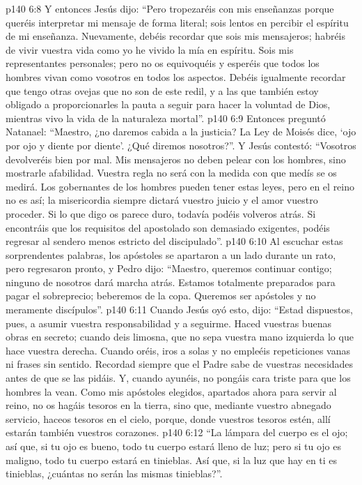 \vs p140 6:8 Y entonces Jesús dijo: “Pero tropezaréis con mis enseñanzas porque queréis interpretar mi mensaje de forma literal; sois lentos en percibir el espíritu de mi enseñanza. Nuevamente, debéis recordar que sois mis mensajeros; habréis de vivir vuestra vida como yo he vivido la mía en espíritu. Sois mis representantes personales; pero no os equivoquéis y esperéis que todos los hombres vivan como vosotros en todos los aspectos. Debéis igualmente recordar que tengo otras ovejas que no son de este redil, y a las que también estoy obligado a proporcionarles la pauta a seguir para hacer la voluntad de Dios, mientras vivo la vida de la naturaleza mortal”.
\vs p140 6:9 Entonces preguntó Natanael: “Maestro, ¿no daremos cabida a la justicia? La Ley de Moisés dice, ‘ojo por ojo y diente por diente’. ¿Qué diremos nosotros?”. Y Jesús contestó: “Vosotros devolveréis bien por mal. Mis mensajeros no deben pelear con los hombres, sino mostrarle afabilidad. Vuestra regla no será con la medida con que medís se os medirá. Los gobernantes de los hombres pueden tener estas leyes, pero en el reino no es así; la misericordia siempre dictará vuestro juicio y el amor vuestro proceder. Si lo que digo os parece duro, todavía podéis volveros atrás. Si encontráis que los requisitos del apostolado son demasiado exigentes, podéis regresar al sendero menos estricto del discipulado”.
\vs p140 6:10 Al escuchar estas sorprendentes palabras, los apóstoles se apartaron a un lado durante un rato, pero regresaron pronto, y Pedro dijo: “Maestro, queremos continuar contigo; ninguno de nosotros dará marcha atrás. Estamos totalmente preparados para pagar el sobreprecio; beberemos de la copa. Queremos ser apóstoles y no meramente discípulos”.
\vs p140 6:11 Cuando Jesús oyó esto, dijo: “Estad dispuestos, pues, a asumir vuestra responsabilidad y a seguirme. Haced vuestras buenas obras en secreto; cuando deis limosna, que no sepa vuestra mano izquierda lo que hace vuestra derecha. Cuando oréis, iros a solas y no empleéis repeticiones vanas ni frases sin sentido. Recordad siempre que el Padre sabe de vuestras necesidades antes de que se las pidáis. Y, cuando ayunéis, no pongáis cara triste para que los hombres la vean. Como mis apóstoles elegidos, apartados ahora para servir al reino, no os hagáis tesoros en la tierra, sino que, mediante vuestro abnegado servicio, haceos tesoros en el cielo, porque, donde vuestros tesoros estén, allí estarán también vuestros corazones.
\vs p140 6:12 “La lámpara del cuerpo es el ojo; así que, si tu ojo es bueno, todo tu cuerpo estará lleno de luz; pero si tu ojo es maligno, todo tu cuerpo estará en tinieblas. Así que, si la luz que hay en ti es tinieblas, ¿cuántas no serán las mismas tinieblas?”.
